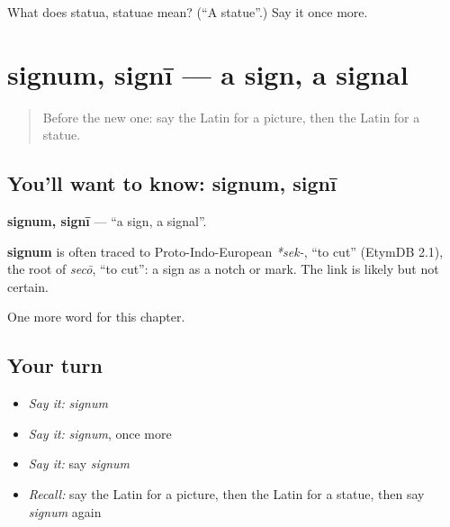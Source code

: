\begin{tcolorbox}[breakable,colback=teal!4,colframe=teal!35!black,title={Before you move on}]
What does statua, statuae mean? (\textquotedblleft{}A statue\textquotedblright{}.) Say it once more.
\end{tcolorbox}
\section[signum, signī]{signum, signī — a sign, a signal}

\label{lesson:LA-C125-signum}



\begin{quote}
Before the new one: say the Latin for a picture, then the Latin for a statue.
\end{quote}

\subsection*{You'll want to know: signum, signī}
\textbf{signum, signī} — \textquotedblleft{}a sign, a signal\textquotedblright{}.

\begin{cousinweb}
\textbf{signum} is often traced to Proto-Indo-European \emph{*sek-}, \textquotedblleft{}to cut\textquotedblright{} (EtymDB 2.1), the root of \emph{secō}, \textquotedblleft{}to cut\textquotedblright{}: a sign as a notch or mark. The link is likely but not certain.
\end{cousinweb}

\begin{grammarlens}[title={What you've built}]
One more word for this chapter.
\end{grammarlens}

\subsection*{Your turn}
\begin{itemize}
\raggedright
  \item \emph{Say it:} \emph{signum}
  \item \emph{Say it:} \emph{signum}, once more
  \item \emph{Say it:} say \emph{signum}
  \item \emph{Recall:} say the Latin for a picture, then the Latin for a statue, then say \emph{signum} again
\end{itemize}


